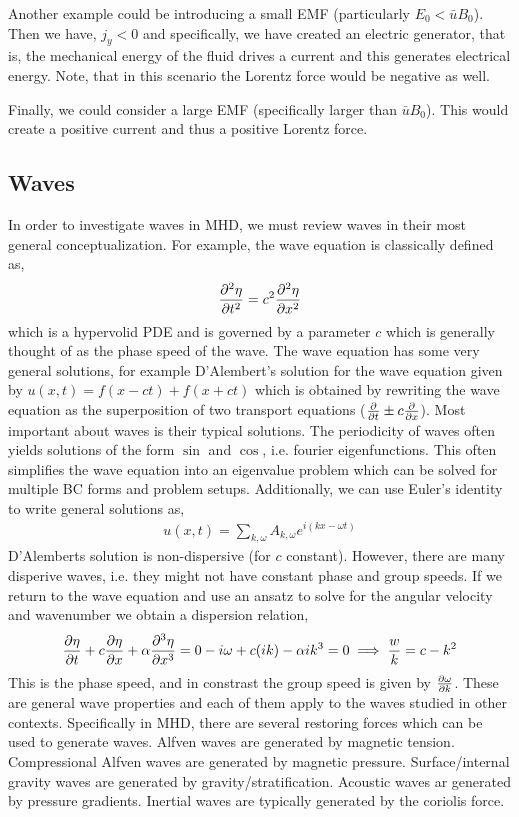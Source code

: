 \documentclass{article}
\begin{document}
Another example could be introducing a small EMF (particularly $E_0 <
\bar{u}B_0$). Then we have, $j_y < 0$ and specifically, we have created an
electric generator, that is, the mechanical energy of the fluid drives a current
and this generates electrical energy. Note, that in this scenario the Lorentz
force would be negative as well. 

Finally, we could consider a large EMF (specifically larger than $\bar{u}B_0$).
This would create a positive current and thus a positive Lorentz force. 

\subsection{Waves}
In order to investigate waves in MHD, we must review waves in their most general
conceptualization. For example, the wave equation is classically defined as, 
\begin{gather*}
    \frac{\partial^2 \eta}{\partial t^2} = c^2\frac{\partial^2 \eta}{\partial x^2}
\end{gather*}
which is a hypervolid PDE and is governed by a parameter $c$ which is generally
thought of as the phase speed of the wave. The wave equation has some very
general solutions, for example D'Alembert's solution for the wave equation given
by $u(x,t) = f(x-ct) + f(x + ct)$ which is obtained by rewriting the wave
equation as the superposition of two transport equations ($\frac{\partial }{\partial t} \pm c\frac{\partial }{\partial x}$).
Most important about waves is their typical solutions. The periodicity of waves
often yields solutions of the form $\sin$ and $\cos$, i.e. fourier
eigenfunctions. This often simplifies the wave equation into an eigenvalue
problem which can be solved for multiple BC forms and problem setups.
Additionally, we can use Euler's identity to write general solutions as, 
\begin{gather*}
    u(x,t) = \sum_{k,\omega} A_{k,\omega}e^{i(kx - \omega t)}
\end{gather*}
D'Alemberts solution is non-dispersive (for $c$ constant). However, there are
many disperive waves, i.e. they might not have constant phase and group speeds.
If we return to the wave equation and use an ansatz to solve for the angular
velocity and wavenumber we obtain a dispersion relation, 
\begin{gather*}
    \frac{\partial \eta}{\partial t} + c\frac{\partial \eta}{\partial x} +\alpha\frac{\partial ^3\eta}{\partial x^3} = 0
    -i\omega + c(ik) - \alpha ik^3 = 0 \implies \frac{w}{k} = c - k^2
\end{gather*}
This is the phase speed, and in constrast the group speed is given by
$\frac{\partial \omega}{\partial k}$. These are general wave properties and each of them apply to
the waves studied in other contexts. Specifically in MHD, there are several
restoring forces which can be used to generate waves. Alfven waves are generated
by magnetic tension. Compressional Alfven waves are generated by magnetic
pressure. Surface/internal gravity waves are generated by
gravity/stratification. Acoustic waves ar generated by pressure gradients.
Inertial waves are typically generated by the coriolis force. 


\begin{gather*}
\end{gather*}
\end{document}
